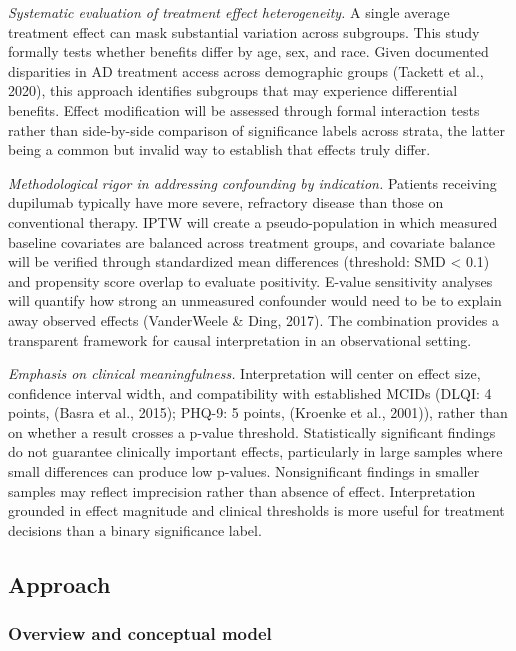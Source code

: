 \documentclass[
]{agujournal2019}
\begin{document}
\emph{Systematic evaluation of treatment effect heterogeneity.} A single
average treatment effect can mask substantial variation across
subgroups. This study formally tests whether benefits differ by age,
sex, and race. Given documented disparities in AD treatment access
across demographic groups (Tackett et al., 2020), this approach
identifies subgroups that may experience differential benefits. Effect
modification will be assessed through formal interaction tests rather
than side-by-side comparison of significance labels across strata, the
latter being a common but invalid way to establish that effects truly
differ.

\emph{Methodological rigor in addressing confounding by indication.}
Patients receiving dupilumab typically have more severe, refractory
disease than those on conventional therapy. IPTW will create a
pseudo-population in which measured baseline covariates are balanced
across treatment groups, and covariate balance will be verified through
standardized mean differences (threshold: SMD \textless{} 0.1) and
propensity score overlap to evaluate positivity. E-value sensitivity
analyses will quantify how strong an unmeasured confounder would need to
be to explain away observed effects (VanderWeele \& Ding, 2017). The
combination provides a transparent framework for causal interpretation
in an observational setting.

\emph{Emphasis on clinical meaningfulness.} Interpretation will center
on effect size, confidence interval width, and compatibility with
established MCIDs (DLQI: 4 points, (Basra et al., 2015); PHQ-9: 5
points, (Kroenke et al., 2001)), rather than on whether a result crosses
a p-value threshold. Statistically significant findings do not guarantee
clinically important effects, particularly in large samples where small
differences can produce low p-values. Nonsignificant findings in smaller
samples may reflect imprecision rather than absence of effect.
Interpretation grounded in effect magnitude and clinical thresholds is
more useful for treatment decisions than a binary significance label.

\subsection{Approach}\label{approach}

\subsubsection{Overview and conceptual
model}\label{overview-and-conceptual-model}
\end{document}
